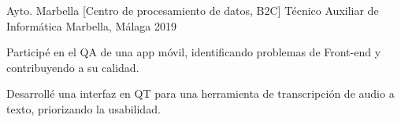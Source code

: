 \begin{cventries}
    \cventry
    {Ayto. Marbella [Centro de procesamiento de datos, B2C]}
    {Técnico Auxiliar de Informática}
    {Marbella, Málaga}
    {2019}
    {
    \begin{cvitems}
        \item{Participé en el QA de una app móvil, identificando problemas de Front-end y contribuyendo a su calidad.}
        \item{Desarrollé una interfaz en QT para una herramienta de transcripción de audio a texto, priorizando la usabilidad.}
    \end{cvitems}
    }

\end{cventries}

